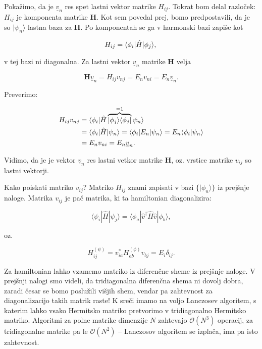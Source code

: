 \documentclass[a4 paper, 12pt]{article}
\begin{document}
Pokažimo, da je $\underline{v}_n$ res spet lastni vektor matrike $H_{ij}$. Tokrat bom delal razloček: $H_{ij}$
je komponenta matrike $\mathbf{H}$. Kot sem povedal prej, bomo predpostavili, da je so $|\psi_n\rangle$ lastna baza
za $\mathbf{H}$. Po komponentah se ga v harmonski bazi zapiše kot

\[
	H_{ij} = \langle\phi_i|\hat{H}|\phi_j\rangle, \\
\]

v tej bazi ni diagonalna. Za lastni vektor $\underline{v}_n$ matrike $\mathbf{H}$ velja

\[
	\mathbf{H}\underline{v}_n = H_{ij}v_{nj} = E_n v_{ni} = E_n \underline{v}_n.
\]

Preverimo:

\begin{align}
	H_{ij}v_{nj} &= \langle\phi_i|\hat{H}\overbrace{|\phi_j\rangle\langle\phi_j|}^{= 1}\psi_n\rangle \notag \\
	&= \langle\phi_i|\hat{H}|\psi_n\rangle = \langle\phi_i|E_n|\psi_n\rangle = E_n \langle\phi_i|\psi_n\rangle \notag \\
	&= E_n v_{ni} = E_n \underline{v}_n. \label{dokaz}
\end{align}

Vidimo, da je je vektor $\underline{v}_n$ res lastni vetkor matrike $\mathbf{H}$, oz. vrstice matrike $v_{ij}$ so
lastni vektorji.

Kako poiskati matriko $v_{ij}$? Matriko $H_{ij}$ znami zapisati v bazi $\big\{|\phi_n\rangle\big\}$ iz prejšnje naloge.
Matrika $v_{ij}$ je pač matrika, ki ta hamiltonian diagonalizira:

\[
	\langle\psi_i|\hat{H}|\psi_j\rangle = \langle\phi_a|\hat{v}^\dagger\hat{H}\hat{v}|\phi_b\rangle,
\]

oz.

\[
	H^{(\psi)}_{ij} = v_{ia}^* H^{(\phi)}_{ab} v_{bj} = E_i\delta_{ij}.
\]

Za hamiltonian lahko vzamemo matriko iz diferenčne sheme iz prejšnje naloge. V prejšnji nalogi smo videli, da
tridiagonalna diferenčna shema ni dovolj dobra, zaradi česar se bomo poslužili višjih shem, vendar pa zahtevnost
za diagonalizacijo takih matrik raste! K sreči imamo na voljo Lanczosev algoritem, s katerim lahko vsako Hermitsko matriko
pretvorimo v tridiagonalno Hermitsko matriko. Algoritmi za polne matrike dimenzije $N$ zahtevajo $\mathcal{O}(N^3)$
operacij, za tridiagonalne matrike pa le $\mathcal{O}(N^2)$ -- Lanczosov algoritem se izplača, ima pa isto zahtevnost.
\end{document}
